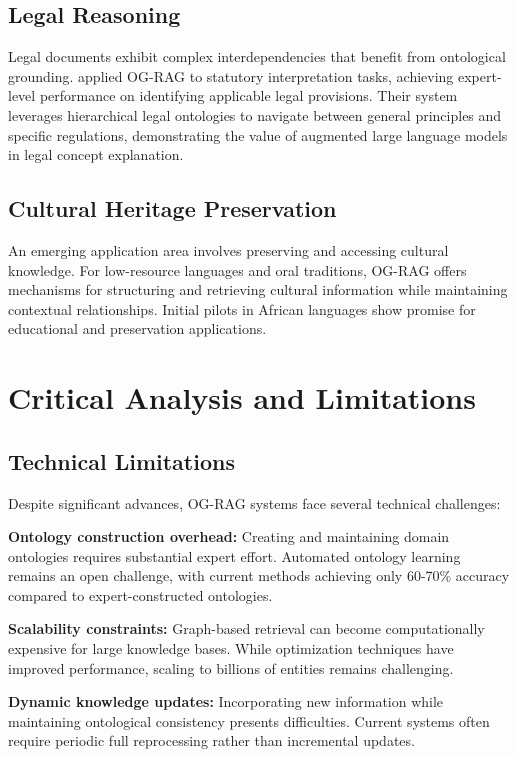 \documentclass[12pt]{report}
\begin{document}
\subsection{Legal Reasoning}

Legal documents exhibit complex interdependencies that benefit from ontological grounding. \citet{savelkaExplainingLegalConcepts2023} applied OG-RAG to statutory interpretation tasks, achieving expert-level performance on identifying applicable legal provisions. Their system leverages hierarchical legal ontologies to navigate between general principles and specific regulations, demonstrating the value of augmented large language models in legal concept explanation.

\subsection{Cultural Heritage Preservation}

An emerging application area involves preserving and accessing cultural knowledge. For low-resource languages and oral traditions, OG-RAG offers mechanisms for structuring and retrieving cultural information while maintaining contextual relationships. Initial pilots in African languages show promise for educational and preservation applications.

\section{Critical Analysis and Limitations}

\subsection{Technical Limitations}

Despite significant advances, OG-RAG systems face several technical challenges:

\textbf{Ontology construction overhead:} Creating and maintaining domain ontologies requires substantial expert effort. Automated ontology learning remains an open challenge, with current methods achieving only 60-70\% accuracy compared to expert-constructed ontologies.

\textbf{Scalability constraints:} Graph-based retrieval can become computationally expensive for large knowledge bases. While optimization techniques have improved performance, scaling to billions of entities remains challenging.

\textbf{Dynamic knowledge updates:} Incorporating new information while maintaining ontological consistency presents difficulties. Current systems often require periodic full reprocessing rather than incremental updates.
\end{document}
